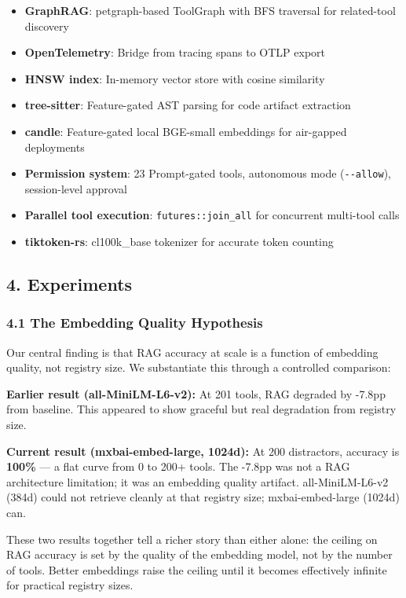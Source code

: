 \documentclass[
  10pt,
]{article}
\providecommand{\tightlist}{%
  \setlength{\itemsep}{0pt}\setlength{\parskip}{0pt}}
\begin{document}
\begin{itemize}
\tightlist
\item
  \textbf{GraphRAG}: petgraph-based ToolGraph with BFS traversal for
  related-tool discovery
\item
  \textbf{OpenTelemetry}: Bridge from tracing spans to OTLP export
\item
  \textbf{HNSW index}: In-memory vector store with cosine similarity
\item
  \textbf{tree-sitter}: Feature-gated AST parsing for code artifact
  extraction
\item
  \textbf{candle}: Feature-gated local BGE-small embeddings for
  air-gapped deployments
\item
  \textbf{Permission system}: 23 Prompt-gated tools, autonomous mode
  (\texttt{-\/-allow}), session-level approval
\item
  \textbf{Parallel tool execution}: \texttt{futures::join\_all} for
  concurrent multi-tool calls
\item
  \textbf{tiktoken-rs}: cl100k\_base tokenizer for accurate token
  counting
\end{itemize}

\subsection{4. Experiments}\label{experiments}

\subsubsection{4.1 The Embedding Quality
Hypothesis}\label{the-embedding-quality-hypothesis}

Our central finding is that RAG accuracy at scale is a function of
embedding quality, not registry size. We substantiate this through a
controlled comparison:

\textbf{Earlier result (all-MiniLM-L6-v2):} At 201 tools, RAG degraded
by -7.8pp from baseline. This appeared to show graceful but real
degradation from registry size.

\textbf{Current result (mxbai-embed-large, 1024d):} At 200 distractors,
accuracy is \textbf{100\%} --- a flat curve from 0 to 200+ tools. The
-7.8pp was not a RAG architecture limitation; it was an embedding
quality artifact. all-MiniLM-L6-v2 (384d) could not retrieve cleanly at
that registry size; mxbai-embed-large (1024d) can.

These two results together tell a richer story than either alone: the
ceiling on RAG accuracy is set by the quality of the embedding model,
not by the number of tools. Better embeddings raise the ceiling until it
becomes effectively infinite for practical registry sizes.
\end{document}
